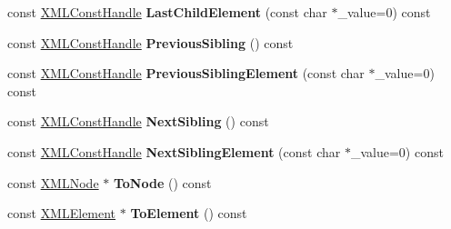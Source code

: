 \begin{DoxyCompactItemize}
\item 
\hypertarget{classtinyxml2_1_1_x_m_l_const_handle_a1c400e66dace6fdab4927adb21090059}{}const \hyperlink{classtinyxml2_1_1_x_m_l_const_handle}{X\+M\+L\+Const\+Handle} {\bfseries Last\+Child\+Element} (const char $\ast$\+\_\+value=0) const \label{classtinyxml2_1_1_x_m_l_const_handle_a1c400e66dace6fdab4927adb21090059}

\item 
\hypertarget{classtinyxml2_1_1_x_m_l_const_handle_a6917564e26b2c20ebdcb23c7940ad80a}{}const \hyperlink{classtinyxml2_1_1_x_m_l_const_handle}{X\+M\+L\+Const\+Handle} {\bfseries Previous\+Sibling} () const \label{classtinyxml2_1_1_x_m_l_const_handle_a6917564e26b2c20ebdcb23c7940ad80a}

\item 
\hypertarget{classtinyxml2_1_1_x_m_l_const_handle_acb2e1c5762eff9f6ed72d1a2dfc14271}{}const \hyperlink{classtinyxml2_1_1_x_m_l_const_handle}{X\+M\+L\+Const\+Handle} {\bfseries Previous\+Sibling\+Element} (const char $\ast$\+\_\+value=0) const \label{classtinyxml2_1_1_x_m_l_const_handle_acb2e1c5762eff9f6ed72d1a2dfc14271}

\item 
\hypertarget{classtinyxml2_1_1_x_m_l_const_handle_a596e248c8014d718f41658502a2e221b}{}const \hyperlink{classtinyxml2_1_1_x_m_l_const_handle}{X\+M\+L\+Const\+Handle} {\bfseries Next\+Sibling} () const \label{classtinyxml2_1_1_x_m_l_const_handle_a596e248c8014d718f41658502a2e221b}

\item 
\hypertarget{classtinyxml2_1_1_x_m_l_const_handle_a3bbdd3d866c750473bd69a232704503b}{}const \hyperlink{classtinyxml2_1_1_x_m_l_const_handle}{X\+M\+L\+Const\+Handle} {\bfseries Next\+Sibling\+Element} (const char $\ast$\+\_\+value=0) const \label{classtinyxml2_1_1_x_m_l_const_handle_a3bbdd3d866c750473bd69a232704503b}

\item 
\hypertarget{classtinyxml2_1_1_x_m_l_const_handle_a95d0256318c10c3f75fa5f8ffb3e4bc1}{}const \hyperlink{classtinyxml2_1_1_x_m_l_node}{X\+M\+L\+Node} $\ast$ {\bfseries To\+Node} () const \label{classtinyxml2_1_1_x_m_l_const_handle_a95d0256318c10c3f75fa5f8ffb3e4bc1}

\item 
\hypertarget{classtinyxml2_1_1_x_m_l_const_handle_a5a48adefc2a5e70d4ce5b55692a0e2f9}{}const \hyperlink{classtinyxml2_1_1_x_m_l_element}{X\+M\+L\+Element} $\ast$ {\bfseries To\+Element} () const \label{classtinyxml2_1_1_x_m_l_const_handle_a5a48adefc2a5e70d4ce5b55692a0e2f9}


\end{DoxyCompactItemize}
